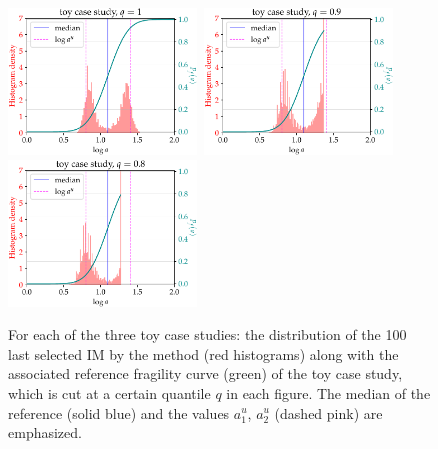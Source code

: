     
    \begin{figure}[h]
            \centering%
            \includegraphics[width=5cm]{figures/DoE/toy_A_1.pdf}\ 
            \includegraphics[width=5cm]{figures/DoE/toy_A_09.pdf}\ 
            \includegraphics[width=5cm]{figures/DoE/toy_A_08.pdf}%
            \caption{For each of the three toy case studies: the distribution of the 100 last selected IM by the method (red histograms) along with the associated reference fragility curve (green) of the toy case study, which is cut at a certain quantile $q$ in each figure. The median of the reference (solid blue) and the values $a^u_{1}$, $a^u_{2}$ (dashed pink) are emphasized.}
            \label{fig:histograms_toy}
        \end{figure}
    
